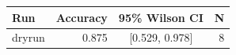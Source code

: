 \begin{tabular}{lrcr}
\toprule
Run & Accuracy & 95\% Wilson CI & N \\
\midrule
dryrun & 0.875 & [0.529, 0.978] & 8 \\
\bottomrule
\end{tabular}
